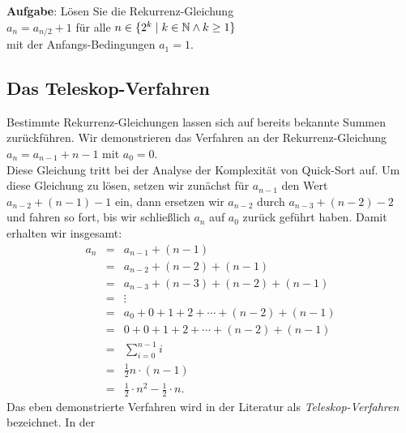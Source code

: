 \noindent
\textbf{Aufgabe}:  L\"osen Sie die Rekurrenz-Gleichung \\[0.1cm]
\hspace*{1.3cm} $a_{n} = a_{n/2} + 1$ \quad f\"ur alle $n \in \{ 2^k \mid k \in {\mathbb N} \wedge k \geq 1\}$\\[0.1cm]
mit der Anfangs-Bedingungen $a_1 = 1$.
\vspace*{0.3cm}


\subsection{Das Teleskop-Verfahren}
Bestimmte Rekurrenz-Gleichungen lassen sich auf bereits bekannte Summen zur\"uckf\"uhren.  Wir demonstrieren
das Verfahren an der Rekurrenz-Gleichung \\[0.2cm]
\hspace*{1.3cm} $a_n = a_{n-1} + n - 1$ \quad mit $a_0 = 0$. 
\\[0.2cm]
Diese Gleichung tritt bei der Analyse der Komplexit\"at von Quick-Sort auf.
Um diese Gleichung zu l\"osen, setzen wir zun\"achst f\"ur $a_{n-1}$ den Wert $a_{n-2} + (n-1) - 1$ ein, dann 
ersetzen wir $a_{n-2}$ durch $a_{n-3} + (n-2) -2$ und fahren so fort, bis wir schlie{\ss}lich $a_n$ auf $a_0$
zur\"uck gef\"uhrt haben.
Damit erhalten wir insgesamt:
\[
\begin{array}{lcl}
  a_n & = & a_{n-1} + (n-1) \\
      & = & a_{n-2} + (n-2) + (n-1) \\
      & = & a_{n-3} + (n-3) + (n-2) + (n-1) \\
      & = & \vdots \\
      & = & a_{0} + 0 + 1 + 2 + \cdots  + (n-2) + (n-1) \\
      & = & 0 + 0 + 1 + 2 + \cdots  + (n-2) + (n-1) \\
      & = & \sum\limits_{i=0}^{n-1} i  \\[0.4cm]
      & = &  \frac{1}{2} n \cdot(n - 1) \\[0.2cm]
      & = & \frac{1}{2} \cdot n^2 - \frac{1}{2} \cdot n.
\end{array}
\]
Das eben demonstrierte Verfahren wird in der Literatur als \emph{Teleskop-Verfahren} bezeichnet.  In der
